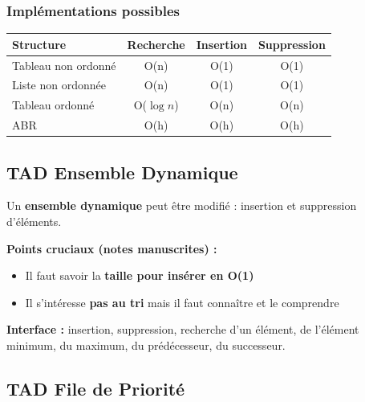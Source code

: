 \documentclass[12pt,a4paper]{article}
\begin{document}
\subsubsection{Implémentations possibles}

\begin{center}
\colorbox{fondjaune}{
\begin{tabular}{|l|c|c|c|}
\hline
\rowcolor{exempleorange!30}
\textbf{Structure} & \textbf{Recherche} & \textbf{Insertion} & \textbf{Suppression} \\
\hline
Tableau non ordonné & O(n) & \textcolor{defvert}{O(1)} & \textcolor{defvert}{O(1)} \\
Liste non ordonnée & O(n) & \textcolor{defvert}{O(1)} & \textcolor{defvert}{O(1)} \\
Tableau ordonné & \textcolor{defvert}{O($\log n$)} & O(n) & O(n) \\
ABR & \textcolor{defvert}{O(h)} & \textcolor{defvert}{O(h)} & \textcolor{defvert}{O(h)} \\
\hline
\end{tabular}}
\end{center}

\subsection{TAD Ensemble Dynamique}

\begin{definition}
Un \textbf{ensemble dynamique} peut être modifié : insertion et suppression d'éléments.
\end{definition}

\begin{notecours}
\textbf{Points cruciaux (notes manuscrites) :}
\begin{itemize}
    \item Il faut savoir la \textbf{taille pour insérer en O(1)}
    \item Il s'intéresse \textbf{pas au tri} mais il faut connaître et le comprendre
\end{itemize}
\end{notecours}

\begin{important}
\textbf{Interface :} insertion, suppression, recherche d'un élément, de l'élément minimum, du maximum, du prédécesseur, du successeur.
\end{important}

\subsection{TAD File de Priorité}
\end{document}
